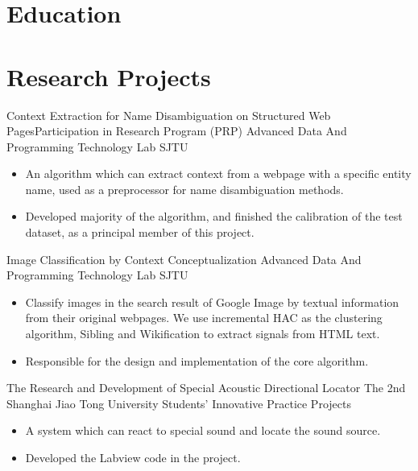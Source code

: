 \documentclass[10pt]{moderncv}   %
\begin{document}
\maketitle

\vspace{-1cm}

\section{Education}

\section{Research Projects}
        {Context Extraction for Name Disambiguation on Structured Web Pages}{Participation in Research Program (PRP)}
        {Advanced Data And Programming Technology Lab\footnotemark{}}
        {SJTU}
        {\begin{itemize}
          \item{An algorithm which can extract context from a webpage with a specific entity name, used as a preprocessor for name disambiguation methods.}
          \item{Developed majority of the algorithm, and finished the calibration of the test dataset, as a principal member of this project.}
         \end{itemize}
        }
        {Image Classification by Context Conceptualization}
        {}
        {Advanced Data And Programming Technology Lab}
        {SJTU}
        {\begin{itemize}
          \item{Classify images in the search result of Google Image by textual information from their original webpages. We use incremental HAC as the clustering algorithm, Sibling and Wikification to extract signals from HTML text.}
          \item{Responsible for the design and implementation of the core algorithm.}
         \end{itemize}
        }
        {The Research and Development of Special Acoustic Directional Locator}
        {The 2nd Shanghai Jiao Tong University Students' Innovative Practice Projects}
        {}
        {}
        {\begin{itemize}
          \item{A system which can react to special sound and locate the sound source.}
          \item{Developed the Labview code in the project.}
         \end{itemize}
        }
\end{document}
